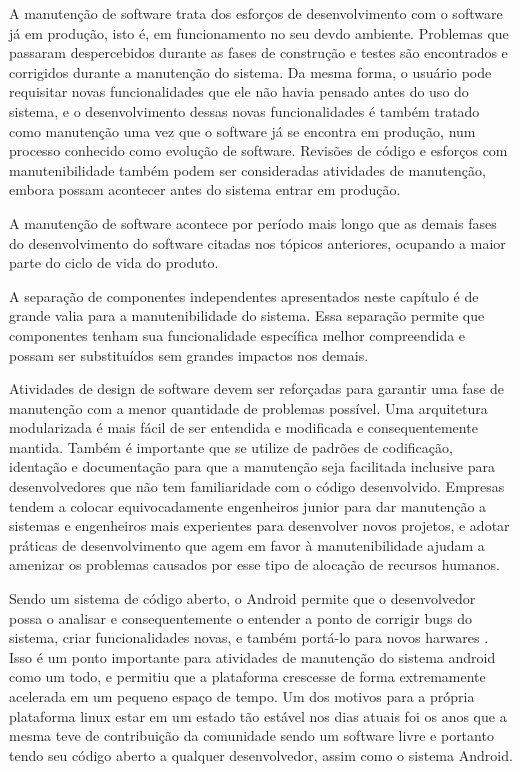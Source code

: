A manutenção de software trata dos esforços de desenvolvimento com o software já em produção, isto é, em funcionamento no seu devdo ambiente. Problemas que passaram despercebidos durante as fases de construção e testes são encontrados e corrigidos durante a manutenção do sistema. Da mesma forma, o usuário pode requisitar novas funcionalidades que ele não havia pensado antes do uso do sistema, e o desenvolvimento dessas novas funcionalidades é também tratado como manutenção uma vez que o software já se encontra em produção, num processo conhecido como evolução de software. Revisões de código e esforços com manutenibilidade também podem ser consideradas atividades de manutenção, embora possam acontecer antes do sistema entrar em produção.

A manutenção de software acontece por período mais longo que as demais fases do desenvolvimento do software citadas nos tópicos anteriores, ocupando a maior parte do ciclo de vida do produto.

A separação de componentes independentes apresentados neste capítulo é de grande valia para a manutenibilidade do sistema. Essa separação permite que componentes tenham sua funcionalidade específica melhor compreendida e possam ser substituídos sem grandes impactos nos demais. 

Atividades de design de software devem ser reforçadas para garantir uma fase de manutenção com a menor quantidade de problemas possível. Uma arquitetura modularizada é mais fácil de ser entendida e modificada e consequentemente mantida. Também é importante que se utilize de padrões de codificação, identação e documentação para que a manutenção seja facilitada inclusive para desenvolvedores que não tem familiaridade com o código desenvolvido. Empresas tendem a colocar equivocadamente engenheiros junior para dar manutenção a sistemas e engenheiros mais experientes para desenvolver novos projetos, e adotar práticas de desenvolvimento que agem em favor à manutenibilidade ajudam a amenizar os problemas causados por esse tipo de alocação de recursos humanos.

Sendo um sistema de código aberto, o Android permite que o desenvolvedor possa o analisar e consequentemente o entender a ponto de corrigir bugs do sistema, criar funcionalidades novas, e também portá-lo para novos harwares \cite{googleandroid}. Isso é um ponto importante para atividades de manutenção do sistema android como um todo, e permitiu que a plataforma crescesse de forma extremamente acelerada em um pequeno espaço de tempo. Um dos motivos para a própria plataforma linux estar em um estado tão estável nos dias atuais foi os anos que a mesma teve de contribuição da comunidade sendo um software livre e portanto tendo seu código aberto a qualquer desenvolvedor, assim como o sistema Android. 